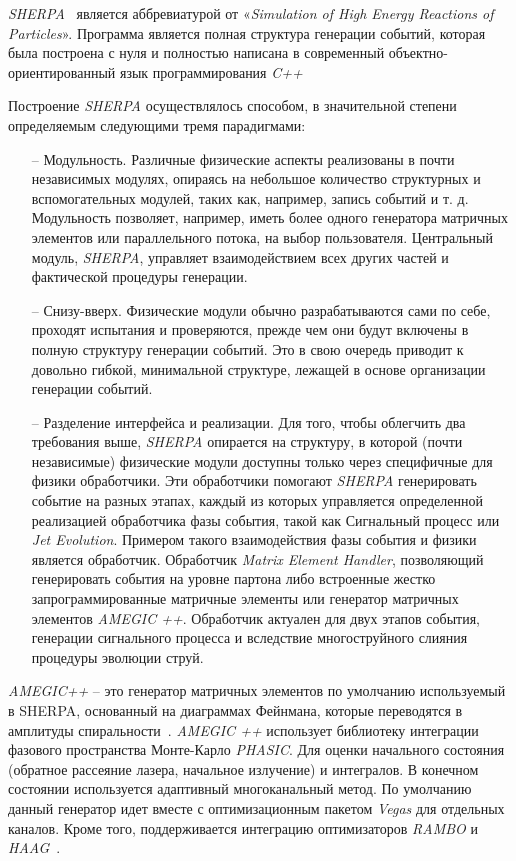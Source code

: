 \textit{SHERPA}~\cite{review-sherpa} является аббревиатурой от «\textit{Simulation of High Energy Reactions of Particles}». Программа является
полная структура генерации событий, которая была построена с нуля и полностью написана в
современный объектно-ориентированный язык программирования \textit{C++}

Построение \textit{SHERPA} осуществлялось способом, в значительной степени определяемым следующими тремя парадигмами:

\begin{enumerate}
	\item[--] Модульность. Различные физические аспекты реализованы в почти независимых модулях, опираясь на
	небольшое количество структурных и вспомогательных модулей, таких как, например, запись событий и т. д. Модульность
	позволяет, например, иметь более одного генератора матричных элементов или параллельного потока,
	на выбор пользователя. Центральный модуль, \textit{SHERPA}, управляет взаимодействием
	всех других частей и фактической процедуры генерации.
	\item[--] Снизу-вверх. Физические модули обычно разрабатываются сами по себе, проходят испытания и
	проверяются, прежде чем они будут включены в полную структуру генерации событий. Это в свою очередь
	приводит к довольно гибкой, минимальной структуре, лежащей в основе организации генерации событий.
	\item[--] Разделение интерфейса и реализации. Для того, чтобы облегчить два требования выше,
	\textit{SHERPA} опирается на структуру, в которой (почти независимые) физические модули доступны только
	через специфичные для физики обработчики. Эти обработчики помогают \textit{SHERPA} генерировать событие на разных
	этапах, каждый из которых управляется определенной реализацией обработчика фазы события, такой как
	Сигнальный процесс или \textit{Jet Evolution}. Примером такого взаимодействия фазы события и физики является обработчик. Обработчик \textit{Matrix Element Handler}, позволяющий генерировать события на уровне партона либо
	встроенные жестко запрограммированные матричные элементы или генератор матричных элементов \textit{AMEGIC ++}. Обработчик
	актуален для двух этапов события, генерации сигнального процесса и вследствие многоструйного слияния процедуры эволюции струй.
\end{enumerate}

\textit{AMEGIC++} -- это генератор матричных элементов по умолчанию используемый в SHERPA, основанный на диаграммах Фейнмана, которые переводятся в амплитуды спиральности~\cite{review-sherpa}.\textit{ AMEGIC ++} использует библиотеку интеграции фазового пространства Монте-Карло \textit{PHASIC}. Для оценки начального состояния (обратное рассеяние лазера, начальное излучение) и интегралов. В конечном состоянии используется адаптивный многоканальный метод. По умолчанию данный генератор идет вместе с оптимизационным пакетом \textit{Vegas} для отдельных каналов. Кроме того, поддерживается интеграцию оптимизаторов \textit{RAMBO} и \textit{HAAG}~\cite{review-sherpa}.

